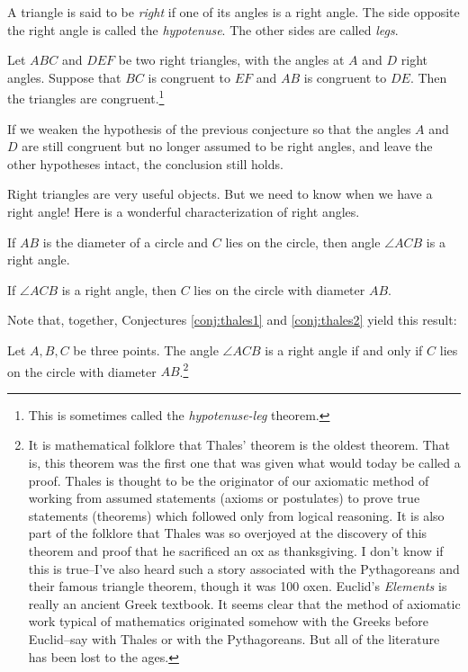 \begin{definition}
\label{defn:right-triangles}
A triangle is said to be \emph{right} if one of its angles is a right angle. 
The side opposite the right angle is called the \emph{hypotenuse}. 
The other sides are called \emph{legs}.
\end{definition}

\begin{conjecture}
\label{conj:RASS}
Let $ABC$ and $DEF$ be two right triangles, with the angles at $A$ and $D$ right angles. 
Suppose that $BC$ is congruent to $EF$ and $AB$ is congruent to $DE$. 
Then the triangles are congruent.\footnote{This is sometimes called the \emph{hypotenuse-leg} theorem.}
\end{conjecture}

\begin{conjecture}
\label{conj:ASS}
If we weaken the hypothesis of the previous conjecture so that the angles $A$ and $D$ are still congruent but no longer assumed to be right angles, and leave the other hypotheses intact, the conclusion still holds.
\end{conjecture}

Right triangles are very useful objects. 
But we need to know when we have a right angle! 
Here is a wonderful characterization of right angles.

\begin{conjecture}
\label{conj:thales1}
If $AB$ is the diameter of a circle and $C$ lies on the circle, then angle $\angle ACB$ is a right angle.
\end{conjecture}

\begin{conjecture}
\label{conj:thales2}
If $\angle ACB$ is a right angle, then $C$ lies on the circle with diameter $AB$.
\end{conjecture}

Note that, together, Conjectures \ref{conj:thales1} and \ref{conj:thales2} yield this result:
\begin{unthm} 
Let $A, B, C$ be three points. 
The angle $\angle ACB$ is a right angle if and only if $C$ lies on the circle with diameter $AB$.\footnote{It is mathematical folklore that Thales' theorem is the oldest theorem. 
That is, this theorem was the first one that was given what would today be called a proof. 
Thales is thought to be the originator of our axiomatic method of working from assumed statements (axioms or postulates) to prove true statements (theorems) which followed only from logical reasoning. 
It is also part of the folklore that Thales was so overjoyed at the discovery of this theorem and proof that he sacrificed an ox as thanksgiving. 
I don't know if this is true--I've also heard such a story associated with the Pythagoreans and their famous triangle theorem, though it was 100 oxen. 
Euclid's \emph{Elements} is really an ancient Greek textbook. 
It seems clear that the method of axiomatic work typical of mathematics originated somehow with the Greeks before Euclid--say with Thales or with the Pythagoreans. But all of the literature has been lost to the ages.}
\end{unthm}



